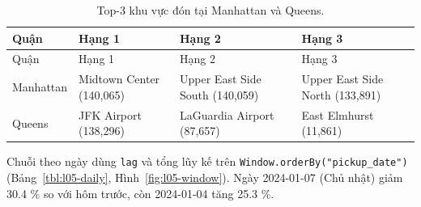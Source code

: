 \documentclass[
  12pt,
  a4paper,
]{report}
\begin{document}
\begin{longtable}[]{@{}
  >{\raggedright\arraybackslash}p{}
  >{\raggedright\arraybackslash}p{}
  >{\raggedright\arraybackslash}p{}
  >{\raggedright\arraybackslash}p{}@{}}
\caption{\label{tbl:l05-top3}Top-3 khu vực đón tại Manhattan và
Queens.}\tabularnewline
\toprule\noalign{}
\begin{minipage}[b]{\linewidth}\raggedright
Quận
\end{minipage} & \begin{minipage}[b]{\linewidth}\raggedright
Hạng 1
\end{minipage} & \begin{minipage}[b]{\linewidth}\raggedright
Hạng 2
\end{minipage} & \begin{minipage}[b]{\linewidth}\raggedright
Hạng 3
\end{minipage} \\
\midrule\noalign{}
\endfirsthead
\toprule\noalign{}
\begin{minipage}[b]{\linewidth}\raggedright
Quận
\end{minipage} & \begin{minipage}[b]{\linewidth}\raggedright
Hạng 1
\end{minipage} & \begin{minipage}[b]{\linewidth}\raggedright
Hạng 2
\end{minipage} & \begin{minipage}[b]{\linewidth}\raggedright
Hạng 3
\end{minipage} \\
\midrule\noalign{}
\endhead
\bottomrule\noalign{}
\endlastfoot
Manhattan & Midtown Center (140,065) & Upper East Side South (140,059) &
Upper East Side North (133,891) \\
Queens & JFK Airport (138,296) & LaGuardia Airport (87,657) & East
Elmhurst (11,861) \\
\end{longtable}

Chuỗi theo ngày dùng \texttt{lag} và tổng lũy kế trên
\texttt{Window.}\allowbreak{}\texttt{orderBy("pickup\_}\allowbreak{}\texttt{date")}\allowbreak{}
(Bảng~\ref{tbl:l05-daily}, Hình~\ref{fig:l05-window}). Ngày 2024-01-07
(Chủ nhật) giảm 30.4 \% so với hôm trước, còn 2024-01-04 tăng 25.3 \%.
\end{document}
